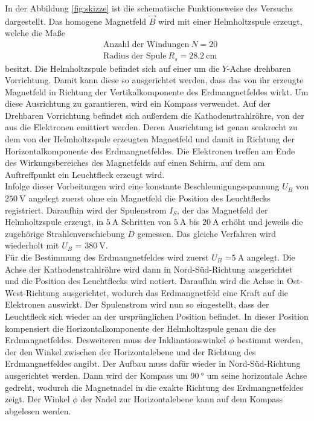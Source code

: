 In der Abbildung \ref{fig:skizze} ist die schematische Funktionsweise des Versuchs dargestellt. Das homogene Magnetfeld $\vec{B}$
wird mit einer Helmholtzspule erzeugt, welche die Maße
\begin{align*}
    &\text{Anzahl der Windungen} \: N = 20 \\
    &\text{Radius der Spule} \: R_s = \SI{28.2}{\centi\m} 
\end{align*}
besitzt.
Die Helmholtzspule befindet sich auf einer um die $Y$-Achse drehbaren Vorrichtung. Damit kann diese 
so ausgerichtet werden, dass das von ihr erzeugte Magnetfeld in Richtung der Vertikalkomponente des Erdmangnetfeldes wirkt. 
Um diese Ausrichtung zu garantieren, wird ein Kompass verwendet. Auf der Drehbaren Vorrichtung befindet sich außerdem die 
Kathodenstrahlröhre, von der aus die Elektronen emittiert werden. Deren Ausrichtung ist genau senkrecht zu dem von der 
Helmholtzspule erzeugten Magnetfeld und damit in Richtung der Horizontalkomponente des Erdmangnetfeldes. Die Elektronen 
treffen am Ende des Wirkungsbereiches des Magnetfelds auf einen Schirm, auf dem am Auftreffpunkt ein Leuchtfleck erzeugt wird.\\
Infolge dieser Vorbeitungen wird eine konstante Beschleunigungsspannung $U_B$ von $\SI{250}{\volt} $ angelegt zuerst ohne ein 
Magnetfeld die Position des Leuchtflecks registriert. Daraufhin wird der Spulenstrom $I_S$, der das Magnetfeld der 
Helmholtzspule erzeugt, in $\SI{5}{\ampere} $ Schritten von $\SI{5}{\ampere} $ bis $\SI{20}{\ampere} $ erhöht und jeweils 
die zugehörige Strahlenverschiebung $D$ gemessen. Das gleiche Verfahren wird wiederholt mit $U_B$ = $\SI{380}{\volt} $. \\
Für die Bestimmung des Erdmangnetfeldes wird zuerst $U_B$ =$\SI{5}{\ampere} $ angelegt. Die Achse der Kathodenstrahlröhre
wird dann in Nord-Süd-Richtung ausgerichtet und die Position des Leuchtflecks wird notiert. Daraufhin wird die Achse in 
Ost-West-Richtung ausgerichtet, wodurch das Erdmangnetfeld eine Kraft auf die Elektronen auswirkt.
Der Spulenstrom wird nun so eingestellt, dass der Leuchtfleck sich wieder an der ursprünglichen Position befindet. In dieser 
Position kompensiert die Horizontalkomponente der Helmholtzspule genau die des Erdmangnetfeldes. 
Desweiteren muss der Inklinationswinkel $\phi$ bestimmt werden, der den Winkel zwischen der Horizontalebene und der Richtung
des Erdmangnetfeldes angibt. Der Aufbau muss dafür wieder in Nord-Süd-Richtung ausgerichtet werden. Dann wird der Kompass
um $\SI{90}{\degree} $ um seine horizontale Achse gedreht, wodurch die Magnetnadel in die exakte Richtung des Erdmangnetfeldes
zeigt. Der Winkel $\phi$ der Nadel zur Horizontalebene kann auf dem Kompass abgelesen werden. 


